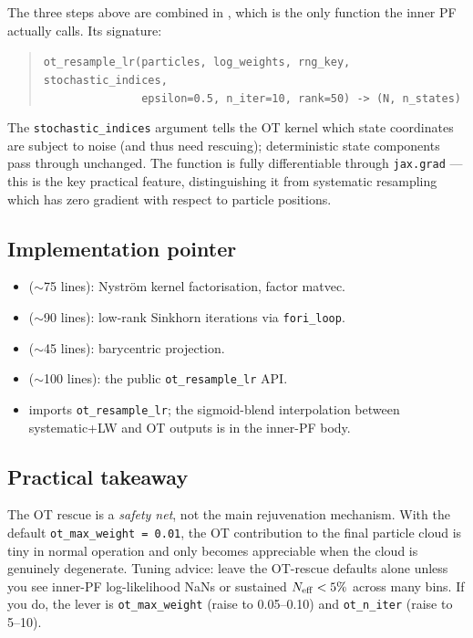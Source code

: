 The three steps above are combined in
, which is the only
function the inner PF actually calls. Its signature:
\begin{quote}\small
\verb|ot_resample_lr(particles, log_weights, rng_key, stochastic_indices,|\\
\verb|               epsilon=0.5, n_iter=10, rank=50) -> (N, n_states)|
\end{quote}
The \texttt{stochastic\_indices} argument tells the OT kernel which
state coordinates are subject to noise (and thus need rescuing);
deterministic state components pass through unchanged. The function is
fully differentiable through \texttt{jax.grad} --- this is the key
practical feature, distinguishing it from systematic resampling which
has zero gradient with respect to particle positions.

\subsection{Implementation pointer}

\begin{itemize}
  \item {} ($\sim$75 lines):
        Nystr\"om kernel factorisation, factor matvec.
  \item {} ($\sim$90 lines): low-rank
        Sinkhorn iterations via \texttt{fori\_loop}.
  \item {} ($\sim$45 lines): barycentric
        projection.
  \item {} ($\sim$100 lines): the
        public \texttt{ot\_resample\_lr} API.
  \item {} imports
        \texttt{ot\_resample\_lr}; the sigmoid-blend interpolation
        between systematic+LW and OT outputs is in the inner-PF body.
\end{itemize}

\subsection{Practical takeaway}

The OT rescue is a \emph{safety net}, not the main rejuvenation
mechanism. With the default \texttt{ot\_max\_weight = 0.01}, the OT
contribution to the final particle cloud is tiny in normal operation
and only becomes appreciable when the cloud is genuinely degenerate.
Tuning advice: leave the OT-rescue defaults alone unless you see
inner-PF log-likelihood NaNs or sustained $N_{\rm eff} < 5\%$ across
many bins. If you do, the lever is \texttt{ot\_max\_weight} (raise to
0.05--0.10) and \texttt{ot\_n\_iter} (raise to 5--10).
